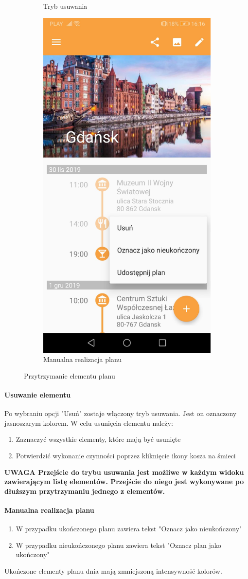 \documentclass[10pt,twoside,a4paper]{report}
\begin{document}
\begin{figure}[h]
\begin{subfigure}{0.3\textwidth}
\caption{Tryb usuwania }
\label{fig:deleteMode}
\end{subfigure}
\begin{subfigure}{0.3\textwidth}
\centering
\includegraphics[width=0.9\linewidth, width=5cm]{popUpMenu}
\caption{Manualna realizacja planu}
\label{fig:popUpMenu}
\end{subfigure}
\caption{Przytrzymanie elementu planu}
\label{fig:podrecznik5}
\end{figure}

\paragraph{Usuwanie elementu}
Po wybraniu opcji "Usuń" zostaje włączony tryb usuwania.
Jest on oznaczony jasnoszarym kolorem.
W celu usunięcia elementu należy:
\begin{enumerate}
\item Zaznaczyć wszystkie elementy, które mają być usunięte
\item Potwierdzić wykonanie czynności poprzez kliknięcie ikony kosza na śmieci
\end{enumerate} 
\textbf{UWAGA Przejście do trybu usuwania jest możliwe w każdym widoku zawierającym listę elementów. Przejście do niego jest wykonywane po dłuższym przytrzymaniu jednego z elementów.}



\paragraph{Manualna realizacja planu}
\begin{enumerate}
\item W przypadku ukończonego planu zawiera tekst "Oznacz jako nieukończony"
\item W przypadku nieukończonego planu zawiera tekst "Oznacz plan jako ukończony"
\end{enumerate} 
Ukończone elementy planu dnia mają zmniejszoną intensywność kolorów.
\end{document}
